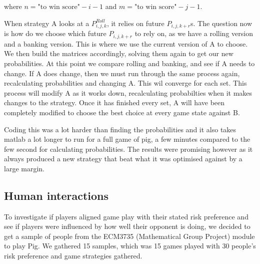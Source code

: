 \documentclass[a4paper,titlepage]{article}
\begin{document}
where $n=\text{"to win score"}-i-1$ and $m=\text{"to win score"}-j-1$.

When strategy A looks at a $P^{Roll}_{i,j,k}$, it relies on future $P_{i,j,k+r}$s. The question now is how do we choose which future $P_{i,j,k+r}$ to rely on, as we have a rolling version and a banking version. This is where we use the current version of A to choose. We then build the matrices accordingly, solving them again to get our new probabilities. At this point we compare rolling and banking, and see if A needs to change. If A does change, then we must run through the same process again, recalculating probabilities and changing A. This wil converge for each set. This process will modify A as it works down, recalculating probabilties when it makes changes to the strategy. Once it has finished every set, A will have been completely modified to choose the best choice at every game state against B.

Coding this was a lot harder than finding the probabilities and it also takes matlab a lot longer to run for a full game of pig, a few minutes compared to the few second for calculating probabilities. The results were promising however as it always produced a new strategy that beat what it was optimised against by a large margin.

\subsection{Human interactions}
To investigate if players aligned game play with their stated risk preference and see if players were influenced by how well their opponent is doing, we decided to get a sample of people from the ECM3735 (Mathematical Group Project) module to play Pig. We gathered 15 samples, which was 15 games played with 30 people’s risk preference and game strategies gathered.
\end{document}
